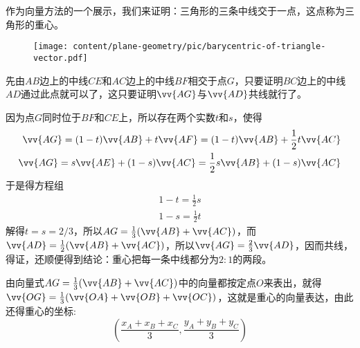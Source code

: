 \begin{example}[三角形的重心]
  \label{example:barycentric-of-triangle-vector}
  作为向量方法的一个展示，我们来证明：三角形的三条中线交于一点，这点称为三角形的重心。
  
\begin{figure}[htbp]
\centering
\texttt{[image: content/plane-geometry/pic/barycentric-of-triangle-vector.pdf]}
\caption{}
\label{fig:barycentric-of-triangle-vector}
\end{figure}

  先由$AB$边上的中线$CE$和$AC$边上的中线$BF$相交于点$G$，只要证明$BC$边上的中线$AD$通过此点就可以了，这只要证明$\vv{AG}$与$\vv{AD}$共线就行了。

  因为点$G$同时位于$BF$和$CE$上，所以存在两个实数$t$和$s$，使得
  \begin{eqnarray*}
    \vv{AG} = (1-t) \vv{AB} + t \vv{AF} = (1-t) \vv{AB} + \frac{1}{2} t \vv{AC} \\
    \vv{AG} = s \vv{AE} + (1-s) \vv{AC} = \frac{1}{2} s \vv{AB} + (1-s) \vv{AC}
  \end{eqnarray*}
  于是得方程组
  \begin{eqnarray*}
    1-t = \frac{1}{2} s \\
    1-s = \frac{1}{2} t
  \end{eqnarray*}
  解得$t=s=2/3$，所以$AG=\frac{1}{3}(\vv{AB}+\vv{AC})$，而$\vv{AD}=\frac{1}{2}(\vv{AB}+\vv{AC})$，所以$\vv{AG}=\frac{2}{3}\vv{AD}$，因而共线，得证，还顺便得到结论：重心把每一条中线都分为$2:1$的两段。

  由向量式$AG=\frac{1}{3}(\vv{AB}+\vv{AC})$中的向量都按定点$O$来表出，就得$\vv{OG}=\frac{1}{3}(\vv{OA}+\vv{OB}+\vv{OC})$，这就是重心的向量表达，由此还得重心的坐标:
  \begin{equation*}
    \left( \frac{x_A+x_B+x_C}{3}, \frac{y_A+y_B+y_C}{3} \right)
  \end{equation*}
\end{example}

